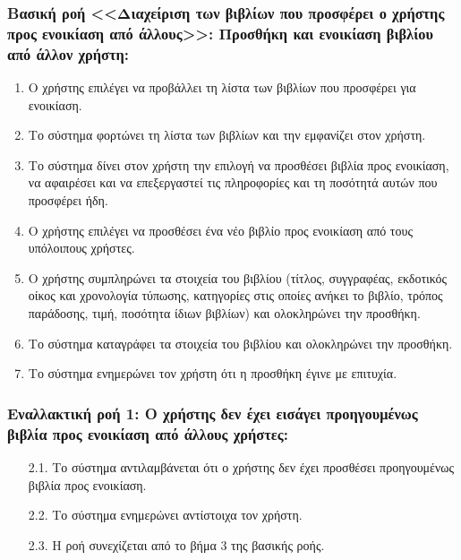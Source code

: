 \documentclass[12pt,a4paper]{article}
\begin{document}
\subsubsection*{Βασική ροή <<Διαχείριση των βιβλίων που προσφέρει ο χρήστης \\προς ενοικίαση από άλλους>>: Προσθήκη και ενοικίαση βιβλίου από άλλον χρήστη:}
\begin{enumerate}
    \item Ο χρήστης επιλέγει να προβάλλει τη λίστα των βιβλίων που προσφέρει για ενοικίαση.
    \item Το σύστημα φορτώνει τη λίστα των βιβλίων και την εμφανίζει στον χρήστη.
    \item Το σύστημα δίνει στον χρήστη την επιλογή να προσθέσει βιβλία προς ενοικίαση, να αφαιρέσει και να επεξεργαστεί τις πληροφορίες και τη ποσότητά αυτών που προσφέρει ήδη.
    \item Ο χρήστης επιλέγει να προσθέσει ένα νέο βιβλίο προς ενοικίαση από τους υπόλοιπους χρήστες.
    \item Ο χρήστης συμπληρώνει τα στοιχεία του βιβλίου (τίτλος, συγγραφέας, εκδοτικός οίκος και χρονολογία τύπωσης, κατηγορίες στις οποίες ανήκει το βιβλίο, τρόπος παράδοσης, τιμή, ποσότητα ίδιων βιβλίων) και ολοκληρώνει την προσθήκη.
    \item Το σύστημα καταγράφει τα στοιχεία του βιβλίου και ολοκληρώνει την προσθήκη.
    \item Το σύστημα ενημερώνει τον χρήστη ότι η προσθήκη έγινε με επιτυχία.
\end{enumerate}

\subsubsection*{Εναλλακτική ροή 1: Ο χρήστης δεν έχει εισάγει προηγουμένως βιβλία προς ενοικίαση από άλλους χρήστες:}
\begin{enumerate}
    \item [2.1.] Το σύστημα αντιλαμβάνεται ότι ο χρήστης δεν έχει προσθέσει προηγουμένως βιβλία προς ενοικίαση.
    \item [2.2.] Το σύστημα ενημερώνει αντίστοιχα τον χρήστη.
    \item [2.3.] Η ροή συνεχίζεται από το βήμα 3 της βασικής ροής.
\end{enumerate}
\end{document}
